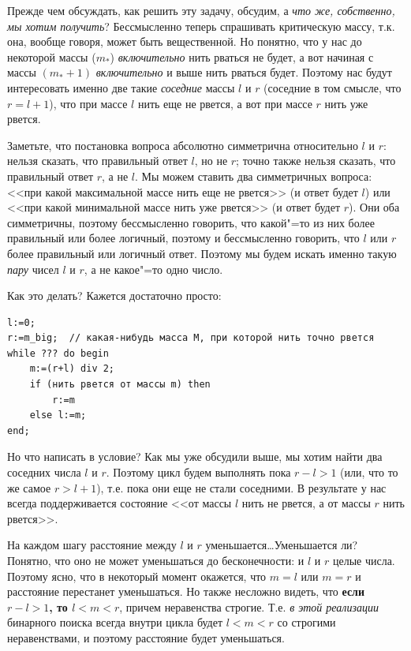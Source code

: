 \documentclass[a4paper,10pt]{problems}
\begin{document}
Прежде чем обсуждать, как решить эту задачу, обсудим, а \textit{что же, собственно, мы хотим получить}? 
Бессмысленно теперь спрашивать критическую массу, т.к. она, вообще говоря, может быть вещественной.
Но понятно, что у нас до некоторой массы ($m_*$) \textit{включительно} нить рваться не будет, а вот начиная с массы
$(m_*+1)$ \textit{включительно} и выше нить рваться будет. 
Поэтому нас будут интересовать именно две такие \textit{соседние} массы $l$ и $r$ (соседние в том смысле, 
что $r=l+1$), что при массе $l$ нить еще не рвется,
а вот при массе $r$ нить уже рвется.

Заметьте, что постановка вопроса абсолютно симметрична относительно $l$ и $r$: нельзя сказать, что правильный ответ $l$, но не $r$; 
точно также нельзя сказать, что правильный ответ $r$, а не $l$. 
Мы можем ставить два симметричных вопроса: <<при какой максимальной массе нить еще не рвется>> (и ответ будет $l$)
или <<при какой минимальной массе нить уже рвется>> (и ответ будет $r$).
Они оба симметричны, поэтому бессмысленно говорить, что какой"=то из них более правильный или более логичный, поэтому
и бессмысленно говорить, что $l$ или $r$ более правильный или логичный ответ. 
Поэтому мы будем искать именно такую \textit{пару} чисел $l$ и $r$, а не какое"=то одно число.

Как это делать? Кажется достаточно просто:
\begin{codesampleo}\begin{verbatim}
l:=0;
r:=m_big;  // какая-нибудь масса M, при которой нить точно рвется
while ??? do begin    
    m:=(r+l) div 2;
    if (нить рвется от массы m) then
        r:=m
    else l:=m;
end;
\end{verbatim}
\end{codesampleo}
Но что написать в условие? 
Как мы уже обсудили выше, мы хотим найти два соседних числа $l$ и $r$. 
Поэтому цикл будем выполнять пока $r-l>1$ (или, что то же самое $r>l+1$), т.е. пока они еще не стали соседними.
В результате у нас всегда поддерживается состояние <<от массы $l$ нить не рвется, а от массы $r$ нить рвется>>.

На каждом шагу расстояние между $l$ и $r$ уменьшается\dots Уменьшается ли?
Понятно, что оно не может уменьшаться до бесконечности: и $l$ и $r$ целые числа.
Поэтому ясно, что в некоторый момент окажется, что $m=l$ или $m=r$ и расстояние перестанет уменьшаться.
Но также несложно видеть, что \textbf{если $r-l>1$, то $l<m<r$}, причем неравенства строгие. 
Т.е. \textit{в этой реализации} бинарного поиска всегда внутри цикла будет $l<m<r$ со строгими неравенствами,
и поэтому расстояние будет уменьшаться.
\end{document}
